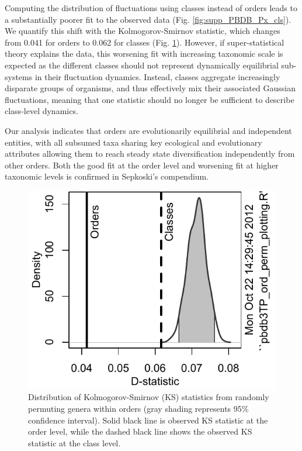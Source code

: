\documentclass[12pt]{article}
\begin{document}
Computing the distribution of fluctuations using classes instead of
orders leads to a substantially poorer fit to the observed data
(Fig. \ref{fig:supp_PBDB_Px_cls}). We quantify this shift with the
Kolmogorov-Smirnov statistic, which changes from 0.041 for orders to
0.062 for classes (Fig. \ref{fig:dStat}). However, if
super-statistical theory explains the data, this worsening fit with
increasing taxonomic scale is expected as the different classes should
not represent dynamically equilibrial sub-systems in their fluctuation
dynamics. Instead, classes aggregate increasingly disparate groups of
organisms, and thus effectively mix their associated Gaussian
fluctuations, meaning that one statistic should no longer be
sufficient to describe class-level dynamics. 

Our analysis indicates that orders are evolutionarily equilibrial and
independent entities, with all subsumed taxa sharing key ecological
and evolutionary attributes allowing them to reach steady state
diversification independently from other orders. Both the good fit at
the order level and worsening fit at higher taxonomic levels is
confirmed in Sepkoski's compendium.

\begin{figure}[!h]
  \centering
  \includegraphics[scale=1]{figs/fig_dStat(3TP).pdf}
  \caption[Goodness of super-statistical theory fit]{Distribution of
    Kolmogorov-Smirnov (KS) statistics from randomly permuting genera
    within orders (gray shading represents 95\% confidence
    interval). Solid black line is observed KS statistic at the order
    level, while the dashed black line shows the observed KS statistic
    at the class level.}
  \label{fig:dStat}
\end{figure}
\end{document}
